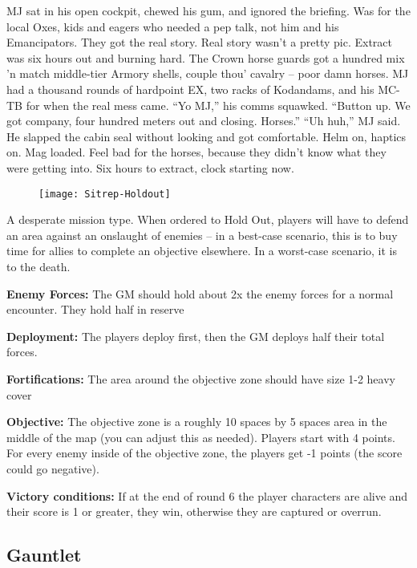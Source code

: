  MJ sat in his open cockpit, chewed his gum, and ignored the briefing. Was for the local Oxes, kids and eagers who needed a pep talk, not him and his Emancipators. They got the real story. Real story wasn't a pretty pic. Extract was six hours out and burning hard. The Crown horse guards got a hundred mix 'n match middle-tier Armory shells, couple thou' cavalry -- poor damn horses. MJ had a thousand rounds of hardpoint EX, two racks of Kodandams, and his MC-TB for when the real mess came. ``Yo MJ,'' his comms squawked. ``Button up. We got company, four hundred meters out and closing. Horses.'' ``Uh huh,'' MJ said. He slapped the cabin seal without looking and got comfortable. Helm on, haptics on. Mag loaded. Feel bad for the horses, because they didn't know what they were getting into. Six hours to extract, clock starting now.

 \begin{figure}\begin{center}
   \texttt{[image: Sitrep-Holdout]}
 \end{center}\end{figure}

 A desperate mission type. When ordered to Hold Out, players will have to defend an area against an onslaught of enemies -- in a best-case scenario, this is to buy time for allies to complete an objective elsewhere. In a worst-case scenario, it is to the death.

 \textbf{Enemy Forces:} The GM should hold about 2x the enemy forces for a normal encounter. They hold half in reserve

 \textbf{Deployment:} The players deploy first, then the GM deploys half their total forces.

 \textbf{Fortifications:} The area around the objective zone should have size 1-2 heavy cover

 \textbf{Objective:} The objective zone is a roughly 10 spaces by 5 spaces area in the middle of the map (you can adjust this as needed). Players start with 4 points. For every enemy inside of the objective zone, the players get -1 points (the score could go negative).

 \textbf{Victory conditions:}  If at the end of round 6 the player characters are alive and their score is 1 or greater, they win, otherwise they are captured or overrun.


 \newpage
 \subsection{Gauntlet}

